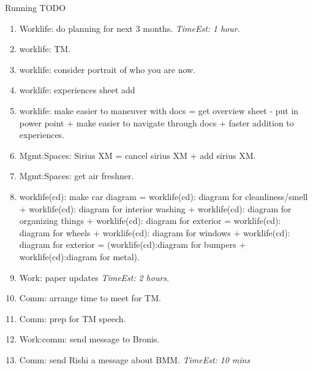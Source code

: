 \documentclass[serif, mathserif, final]{beamer}
\newcommand{\te}[1]{\textit{TimeEst:} \textit{#1}}
\begin{document}
\begin{frame}{}
\begin{columns}
\begin{column}{0.50\linewidth}
\begin{block}{Running TODO}
\begin{enumerate}
   \item \small Worklife: do planning for next 3 months. \te {1
      hour}. 
     \item \small worklife: TM. 
     \item \small worklife: consider portrait of who you are now. 
     \item \small worklife: experiences sheet add
     \item \small worklife: make easier to maneuver with docs = get
       overview sheet - put in power point + make easier to navigate
       through docs + faster addition to experiences. 
     \item \small Mgmt:Spaces: Sirius XM  = cancel sirius XM + add
       sirius XM. 
     \item \small Mgmt:Spaces: get air freshner.
     \item \small worklife(cd): make car diagram = worklife(cd): diagram for
       cleanliness/smell + worklife(cd): diagram for interior washing +
       worklife(cd): diagram for organizing things + worklife(cd): diagram for
       exterior = worklife(cd): diagram for wheels + worklife(cd): diagram
       for windows + worklife(cd): diagram for exterior = (worklife(cd):diagram for bumpers + worklife(cd):diagram for metal). 

      \item \small Work: paper updates \te{2 hours}. 

      \item \small Comm: arrange time to meet for TM. 
      \item \small Comm: prep for TM speech.   
      \item \small Work:comm: send message to Bronis.
      \item \small Comm: send Rishi a message about BMM. \te{10 mins} 


        \end{enumerate}
      \end{block} 
     

\end{column}
\end{columns}
\end{frame}
\end{document}
